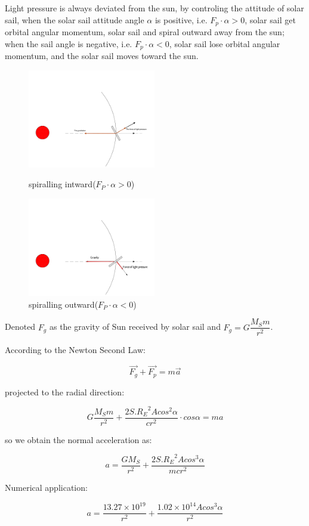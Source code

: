 \documentclass[../Paper.tex]{subfiles}
\begin{document}
Light pressure is always deviated from the sun, by controling the attitude of solar sail, when the solar sail attitude angle $\alpha$ is positive, i.e. $F_p\cdot\alpha>0$, solar sail get orbital angular momentum, solar sail and spiral outward away from the sun; when the sail angle is negative, i.e. $F_p\cdot\alpha<0$, solar sail lose orbital angular momentum, and the solar sail moves toward the sun. 

\begin{figure}[H]
 \begin{minipage}[t]{0.5\linewidth}
 \centering{}
 \includegraphics[width=2.2in]{accelerate.pdf}
 \caption{spiralling intward($F_P\cdot\alpha>0$)}
 \label{fig:side:a}{}
 \end{minipage}%
 \begin{minipage}[t]{0.5\linewidth}
 \centering{}
 \includegraphics[width=2.2in]{../Figures/decrease.pdf}
 \caption{spiralling outwa{}rd($F_P\cdot\alpha<0$)}
 \label{fig:side:b}
 \end{minipage}
\end{figure}

Denoted $F_g$ as the gravity of Sun received by solar sail and $F_g=G\dfrac{M_Sm}{r^2}$.

According to the Newton Second Law:

\begin{equation}
\vec{F_g}+\vec{F_p}=m\vec{a}
\end{equation}

projected to the radial direction:

\begin{equation}
G\dfrac{M_Sm}{r^2}+\dfrac{2S.{R_E}^2Acos^2\alpha}{cr^2}\cdot cos\alpha=ma
\end{equation}

so we obtain the normal acceleration as:

\begin{equation}
a=\dfrac{GM_S}{r^2}+\dfrac{2S.{R_E}^2Acos^3\alpha}{mcr^2}
\end{equation}

Numerical application:

\begin{equation}
a=\dfrac{13.27\times10^{19}}{r^2}+\dfrac{1.02\times10^{14}Acos^3\alpha}{r^2}
\end{equation}
\end{document}
